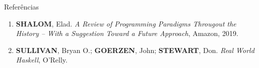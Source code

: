 \begin{frame}[fragile]{Referências}

    \begin{enumerate}
        \item \textbf{SHALOM}, Elad. \textit{A Review of Programming Paradigms Througout the 
            History -- With a Suggestion Toward a Future Approach}, Amazon, 2019.

        \item \textbf{SULLIVAN}, Bryan O.; \textbf{GOERZEN}, John; \textbf{STEWART}, Don. 
            \textit{Real World Haskell}, O'Relly.
    \end{enumerate}

\end{frame}
